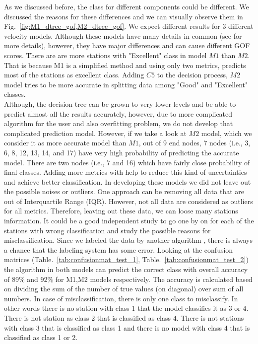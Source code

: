 As we discussed before, the class for different components could be different. We discussed the reasons for these differences and we can visually observe them in Fig.~\ref{fig:M1_dtree_gof,M2_dtree_gof}. We expect different results for 3 different velocity models. Although these models have many details in common (see \citet{Taborda_2014_BSSA} for more details), however, they have major differences and can cause different GOF scores. There are are more stations with "Excellent" class in model $M1$ than $M2$. That is because M1 is a simplified method and using only two metrics, predicts most of the stations as excellent class. Adding $C5$ to the decision process, $M2$ model tries to be more accurate in splitting data among "Good" and "Excellent" classes.\\
Although, the decision tree can be grown to very lower levels and be able to predict almost all the results accurately, however, due to more complicated algorithm for the user and also overfitting problem, we do not develop that complicated prediction model. However, if we take a look at $M2$  model, which we consider it as more accurate model than $M1$, out of 9 end nodes, 7 nodes (i.e., 3, 6, 8, 12, 13, 14, and 17) have very high probability of predicting the accurate model. There are two nodes (i.e., 7 and 16) which have fairly close probability of final classes. Adding more metrics with help to reduce this kind of uncertainties and achieve better classification.
In developing these models we did not leave out the possible noises or outliers. One approach can be removing all data that are out of Interquartile Range (IQR). However, not all data are considered as outliers for all metrics. Therefore, leaving out these data, we can loose many stations information. It could be a good independent study to go one by on for each of the stations with wrong classification and study the possible reasons for misclassification. Since we labeled the data by another algorithm , there is always a chance that the labeling system has some error. 
Looking at the confusion matrices (Table.~\ref{tab:confusionmat_test_1}, Table.~\ref{tab:confusionmat_test_2}) the algorithm in both models can predict the correct class with overall accuracy of 89\% and 92\% for M1,M2 models respectively. The accuracy is calculated based on dividing the sum of the number of true values (on diagonal) over sum of all numbers. In case of misclassification, there is only one class to misclassify. In other words there is no station with class 1 that the model classifies it as 3 or 4.  There is not station as class 2 that is classified as class 4. There is not stations with class 3 that is classified as class 1 and there is no model with class 4 that is classified as class 1 or 2.\\

